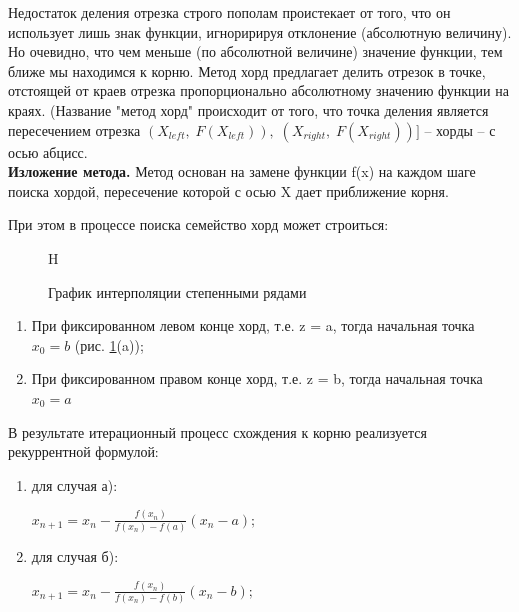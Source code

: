 \documentclass{article}
\begin{document}
				Недостаток деления отрезка строго пополам проистекает от того, что он использует лишь знак функции, игноририруя отклонение (абсолютную величину). Но очевидно, что чем меньше (по абсолютной величине) значение функции, тем ближе мы находимся к корню. Метод хорд предлагает делить отрезок в точке, отстоящей от краев отрезка пропорционально абсолютному значению функции на краях. (Название "метод хорд" происходит от того, что точка деления является пересечением отрезка $(X_{left},\; F(X_{left})), \; (X_{right},\; F(X_{right}))]$ -- хорды -- с осью абцисс.\\
			
				\textbf{Изложение метода.}
				Метод основан на замене функции f(x) на каждом шаге поиска хордой, пересечение которой с осью X дает приближение корня.
			
				При этом в процессе поиска семейство хорд может строиться:
				
				\begin{figure}{H}
					\caption{График интерполяции степенными рядами}
					\label{fig:dix7}
				\end{figure}
				\begin{enumerate}
						\item 
						При фиксированном левом конце хорд, т.е. z = a, тогда начальная точка $x_0=b$ (рис. \ref{fig:dix7}(a));
						\item 
						При фиксированном правом конце хорд, т.е. z = b, тогда начальная точка $x_0=a$
				\end{enumerate}	
				
				В результате итерационный процесс схождения к корню реализуется рекуррентной формулой:

				\begin{enumerate}
						\item 
						для случая а): 
						
						\begin{center}$x_{n+1}=x_n - \frac{f(x_n)}{f(x_n)-f(a)} (x_n - a);$\end{center}
						\item 
						для случая б):\begin{center} $x_{n+1}=x_n - \frac{f(x_n)}{f(x_n)-f(b)} (x_n - b);$\end{center}
				\end{enumerate}
				
\end{document}
